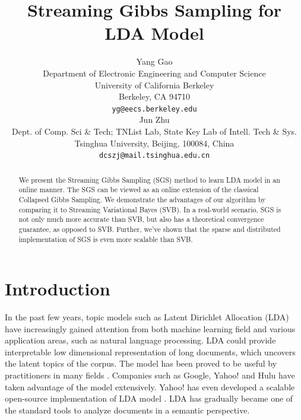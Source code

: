 \documentclass{article} %
\title{Streaming Gibbs Sampling for LDA Model}
\author{
Yang Gao \\
Department of Electronic Engineering and Computer Science\\
University of California Berkeley\\
Berkeley, CA 94710 \\
\texttt{yg@eecs.berkeley.edu} \\
\And
Jun Zhu \\
Dept. of Comp. Sci \& Tech; TNList Lab, State Key Lab of Intell. Tech \& Sys. \\
Tsinghua University, Beijing, 100084, China \\
\texttt{dcszj@mail.tsinghua.edu.cn} \\
}
\begin{document}
\maketitle

\begin{abstract}
We present the Streaming Gibbs Sampling (SGS) method to learn LDA model in an online manner.
The SGS can be viewed as an online extension of the classical Collapsed Gibbs Sampling.
We demonstrate the advantages of our algorithm by comparing it to Streaming Variational Bayes (SVB).
In a real-world scenario, SGS is not only much more accurate than SVB, but also has a theoretical convergence 
guarantee, as opposed to SVB. Further, we've shown that the sparse and distributed implementation of SGS is even more scalable than SVB. 
\end{abstract}


\section{Introduction}
\label{intro}
In the past few years, topic models such as Latent Dirichlet Allocation (LDA) have increasingly gained attention
from both machine learning field and various application areas, such as natural language processing. LDA could provide interpretable low dimensional representation of long documents, which uncovers the latent topics of the corpus. The model has been proved to be useful by practitioners in many fields \cite{mitchell2008vector, naveed2011bad}. Companies such as Google, Yahoo! and Hulu have taken advantage of the model extensively. Yahoo! has even developed a scalable open-source implementation of LDA model \cite{ahmed2012scalable}. LDA has gradually became one of the standard tools to analyze documents in a semantic perspective.
\end{document}
